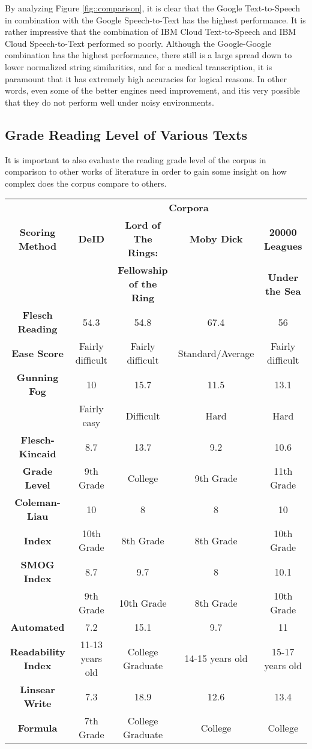 By analyzing Figure \ref{fig::comparison}, it is clear that the Google Text-to-Speech in combination with the Google Speech-to-Text has the highest performance. It is rather impressive that the combination of IBM Cloud Text-to-Speech and IBM Cloud Speech-to-Text performed so poorly. Although the Google-Google combination has the highest performance, there still is a large spread down to lower normalized string similarities, and for a medical transcription, it is paramount that it has extremely high accuracies for logical reasons. In other words, even some of the better engines need improvement, and itis very possible that they do not perform well under noisy environments.


\subsection{Grade Reading Level of Various Texts}

It is important to also evaluate the reading grade level of the corpus in comparison to other works of literature in order to gain some insight on how complex does the corpus compare to others.
\begin{center}
\begin{tabular}{|c|c|c|c|c|}
    \hline
    & \multicolumn{4}{|c|}{\textbf{Corpora}} \\
    \cline{2-5}
    \textbf{Scoring Method} & \textbf{DeID} & \textbf{Lord of The Rings: } & \textbf{Moby Dick} & \textbf{20000 Leagues }\\
     & & \textbf{Fellowship of the Ring} & & \textbf{Under the Sea}\\
    \hline
    \textbf{Flesch Reading} & 54.3 & 54.8 & 67.4 & 56 \\
    \textbf{Ease Score} & Fairly difficult & Fairly difficult & Standard/Average & Fairly difficult \\
    \hline
    \textbf{Gunning Fog} & 10 & 15.7 & 11.5 & 13.1\\
    & Fairly easy & Difficult & Hard & Hard \\
    \hline
    \textbf{Flesch-Kincaid} & 8.7 & 13.7 & 9.2 & 10.6\\
    \textbf{Grade Level} & 9th Grade & College & 9th Grade & 11th Grade\\
    \hline
    \textbf{Coleman-Liau} & 10 & 8 & 8 & 10\\
    \textbf{Index} & 10th Grade & 8th Grade & 8th Grade & 10th Grade \\
    \hline
    \textbf{SMOG Index} & 8.7 & 9.7 & 8 & 10.1\\
    & 9th Grade & 10th Grade & 8th Grade & 10th Grade\\
    \hline
    \textbf{Automated} & 7.2 & 15.1 & 9.7 & 11\\
    \textbf{Readability Index} & 11-13 years old & College Graduate & 14-15 years old & 15-17 years old \\
    \hline
    \textbf{Linsear Write} & 7.3 & 18.9 & 12.6 & 13.4\\
    \textbf{Formula} & 7th Grade & College Graduate & College & College \\
    \hline
\end{tabular}
\end{center}

